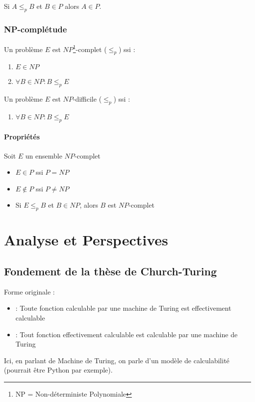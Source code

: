 Si $A \leq_p B$ et $B \in P$ alors $A \in P$.

\subsection{NP-complétude}

Un problème $E$ est $NP$\footnote{NP = Non-déterministe Polynomiale}-complet ($\leq_p$) ssi :
\begin{enumerate}
\item $E \in NP$
\item $\forall B \in NP : B \leq_p E$
\end{enumerate}
Un problème $E$ est $NP$-difficile ($\leq_p$) ssi :
\begin{enumerate}
\item $\forall B \in NP : B \leq_p E$
\end{enumerate}

\subsubsection{Propriétés}

Soit $E$ un ensemble $NP$-complet
\begin{itemize}
\item $E \in P$ ssi $P = NP$
\item $E \notin P$ ssi $P \neq NP$
\item Si $E \leq_p B$ et $B \in NP$, alors $B$ est $NP$-complet
\end{itemize}

\chapter{Analyse et Perspectives}

\section{Fondement de la thèse de Church-Turing}

Forme originale :
\begin{itemize}
\item {} : Toute fonction calculable par une machine de Turing est effectivement calculable
\item {} : Tout fonction effectivement calculable est calculable par une machine de Turing
\end{itemize}

Ici, en parlant de Machine de Turing, on parle d'un modèle de calculabilité (pourrait être Python par exemple).

